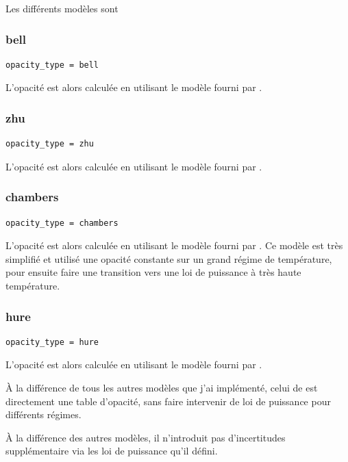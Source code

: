 Les différents modèles sont \citep{bell1994FU, zhu2009nonsteady, chambers2009analytic, hure2000transition}

\subsubsection{bell}
\begin{verbatim}
opacity_type = bell
\end{verbatim}

L'opacité est alors calculée en utilisant le modèle fourni par \cite{bell1994FU}. 

\subsubsection{zhu}
\begin{verbatim}
opacity_type = zhu
\end{verbatim}

L'opacité est alors calculée en utilisant le modèle fourni par \cite{zhu2009nonsteady}. 

\subsubsection{chambers}
\begin{verbatim}
opacity_type = chambers
\end{verbatim}

L'opacité est alors calculée en utilisant le modèle fourni par \cite{chambers2009analytic}. Ce modèle est très simplifié et utilisé une opacité constante sur un grand régime de température, pour ensuite faire une transition vers une loi de puissance à très haute température.

\subsubsection{hure}
\begin{verbatim}
opacity_type = hure
\end{verbatim}

L'opacité est alors calculée en utilisant le modèle fourni par \cite{hure2000transition}. 

À la différence de tous les autres modèles que j'ai implémenté, celui de \cite{hure2000transition} est directement une table d'opacité, sans faire intervenir de loi de puissance pour différents régimes. 

À la différence des autres modèles, il n'introduit pas d'incertitudes supplémentaire via les loi de puissance qu'il défini. 

